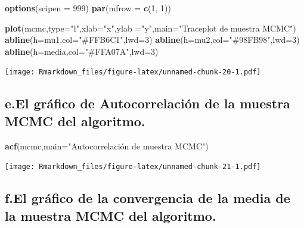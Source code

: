 \documentclass[
]{article}
\newenvironment{Shaded}{\begin{snugshade}}{\end{snugshade}}
\newcommand{\AttributeTok}[1]{\textcolor[rgb]{0.13,0.29,0.53}{#1}}
\newcommand{\DecValTok}[1]{\textcolor[rgb]{0.00,0.00,0.81}{#1}}
\newcommand{\FunctionTok}[1]{\textcolor[rgb]{0.13,0.29,0.53}{\textbf{#1}}}
\newcommand{\NormalTok}[1]{#1}
\newcommand{\StringTok}[1]{\textcolor[rgb]{0.31,0.60,0.02}{#1}}
\begin{document}
\begin{Shaded}
\begin{Highlighting}[]
\FunctionTok{options}\NormalTok{(}\AttributeTok{scipen =} \DecValTok{999}\NormalTok{)}
\FunctionTok{par}\NormalTok{(}\AttributeTok{mfrow =} \FunctionTok{c}\NormalTok{(}\DecValTok{1}\NormalTok{, }\DecValTok{1}\NormalTok{))}

\FunctionTok{plot}\NormalTok{(mcmc,}\AttributeTok{type=}\StringTok{"l"}\NormalTok{,}\AttributeTok{xlab=}\StringTok{"x"}\NormalTok{,}\AttributeTok{ylab =}\StringTok{"y"}\NormalTok{,}\AttributeTok{main=}\StringTok{"Traceplot de muestra MCMC"}\NormalTok{)}
\FunctionTok{abline}\NormalTok{(}\AttributeTok{h=}\NormalTok{mu1,}\AttributeTok{col=}\StringTok{"\#FFB6C1"}\NormalTok{,}\AttributeTok{lwd=}\DecValTok{3}\NormalTok{) }
\FunctionTok{abline}\NormalTok{(}\AttributeTok{h=}\NormalTok{mu2,}\AttributeTok{col=}\StringTok{"\#98FB98"}\NormalTok{,}\AttributeTok{lwd=}\DecValTok{3}\NormalTok{) }
\FunctionTok{abline}\NormalTok{(}\AttributeTok{h=}\NormalTok{media,}\AttributeTok{col=}\StringTok{"\#FFA07A"}\NormalTok{,}\AttributeTok{lwd=}\DecValTok{3}\NormalTok{)}
\end{Highlighting}
\end{Shaded}

\texttt{[image: Rmarkdown\_files/figure-latex/unnamed-chunk-20-1.pdf]}

\hypertarget{e.el-gruxe1fico-de-autocorrelaciuxf3n-de-la-muestra-mcmc-del-algoritmo.}{%
\subsection{e.El gráfico de Autocorrelación de la muestra MCMC del
algoritmo.}\label{e.el-gruxe1fico-de-autocorrelaciuxf3n-de-la-muestra-mcmc-del-algoritmo.}}

\begin{Shaded}
\begin{Highlighting}[]
\FunctionTok{acf}\NormalTok{(mcmc,}\AttributeTok{main=}\StringTok{"Autocorrelación de muestra MCMC"}\NormalTok{)}
\end{Highlighting}
\end{Shaded}

\texttt{[image: Rmarkdown\_files/figure-latex/unnamed-chunk-21-1.pdf]}

\hypertarget{f.el-gruxe1fico-de-la-convergencia-de-la-media-de-la-muestra-mcmc-del-algoritmo.}{%
\subsection{f.El gráfico de la convergencia de la media de la muestra
MCMC del
algoritmo.}\label{f.el-gruxe1fico-de-la-convergencia-de-la-media-de-la-muestra-mcmc-del-algoritmo.}}
\end{document}
